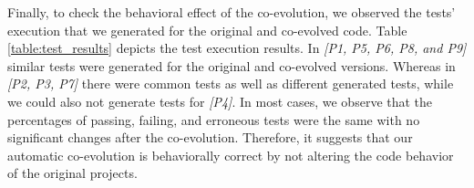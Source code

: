 	
	
	Finally, to check the behavioral effect of the co-evolution, we observed the tests' execution that we generated for the original and co-evolved code. %
	Table \ref{table:test_results} depicts the test execution results. In \emph{[P1, P5, P6, P8, and P9]} similar tests were generated for the original and co-evolved versions. Whereas in \emph{[P2, P3, P7]} there were common tests as well as different generated tests, while we could also not generate tests for \emph{[P4]}. In most cases, we observe that the percentages of passing, failing, and erroneous tests were the same with no significant changes after the co-evolution. 
	Therefore, it suggests that our automatic co-evolution is behaviorally correct by not altering the code behavior of the original projects. 
	
